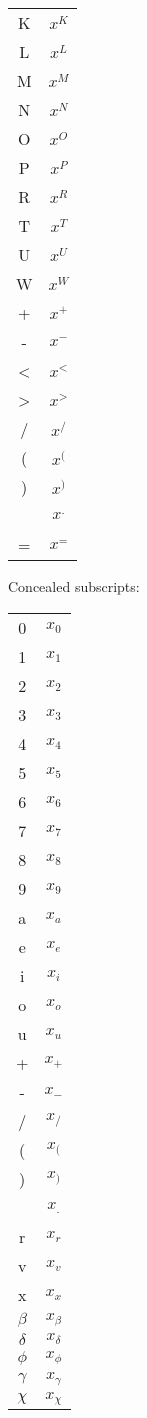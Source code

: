 \documentclass{article}
\begin{document}
\begin{tabular}{c|c}
    K & \(x^K\)\\
    L & \(x^L\)\\
    M & \(x^M\)\\
    N & \(x^N\)\\
    O & \(x^O\)\\
    P & \(x^P\)\\
    R & \(x^R\)\\
    T & \(x^T\)\\
    U & \(x^U\)\\
    W & \(x^W\)\\
    + & \(x^+\)\\
    - & \(x^-\)\\
    < & \(x^<\)\\
    > & \(x^>\)\\
    / & \(x^/\)\\
    ( & \(x^(\)\\
    ) & \(x^)\)\\
    \ & \(x^.\)\\
    = & \(x^=\)\\
\end{tabular}

Concealed subscripts:

\begin{tabular}{c|c}
    0 & \(x_0\)\\
    1 & \(x_1\)\\
    2 & \(x_2\)\\
    3 & \(x_3\)\\
    4 & \(x_4\)\\
    5 & \(x_5\)\\
    6 & \(x_6\)\\
    7 & \(x_7\)\\
    8 & \(x_8\)\\
    9 & \(x_9\)\\
    a & \(x_a\)\\
    e & \(x_e\)\\
    i & \(x_i\)\\
    o & \(x_o\)\\
    u & \(x_u\)\\
    + & \(x_+\)\\
    - & \(x_-\)\\
    / & \(x_/\)\\
    ( & \(x_(\)\\
    ) & \(x_)\)\\
    \ & \(x_.\)\\
    r & \(x_r\)\\
    v & \(x_v\)\\
    x & \(x_x\)\\
    \(\beta\) & \(x_\beta\)\\
    \(\delta\) & \(x_\delta\)\\
    \(\phi\) & \(x_\phi\)\\
    \(\gamma\) & \(x_\gamma\)\\
    \(\chi\) & \(x_\chi\)\\
\end{tabular}
\end{document}
